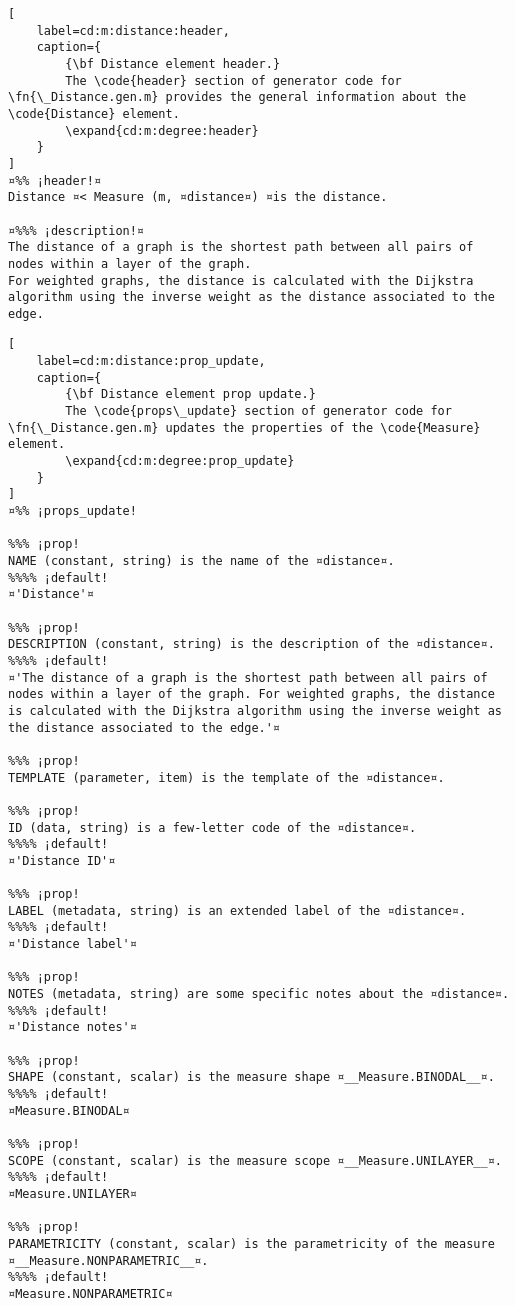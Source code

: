 \documentclass{tufte-handout}
\begin{document}
\begin{lstlisting}[
	label=cd:m:distance:header,
	caption={
		{\bf Distance element header.}
		The \code{header} section of generator code for \fn{\_Distance.gen.m} provides the general information about the \code{Distance} element.
		\expand{cd:m:degree:header}
	}
]
¤%% ¡header!¤
Distance ¤< Measure (m, ¤distance¤) ¤is the distance.

¤%%% ¡description!¤
The distance of a graph is the shortest path between all pairs of nodes within a layer of the graph.
For weighted graphs, the distance is calculated with the Dijkstra algorithm using the inverse weight as the distance associated to the edge.
\end{lstlisting}

\begin{lstlisting}[
	label=cd:m:distance:prop_update,
	caption={
		{\bf Distance element prop update.}
		The \code{props\_update} section of generator code for \fn{\_Distance.gen.m} updates the properties of the \code{Measure} element.
		\expand{cd:m:degree:prop_update}
	}
]
¤%% ¡props_update!

%%% ¡prop!
NAME (constant, string) is the name of the ¤distance¤.
%%%% ¡default!
¤'Distance'¤

%%% ¡prop!
DESCRIPTION (constant, string) is the description of the ¤distance¤.
%%%% ¡default!
¤'The distance of a graph is the shortest path between all pairs of nodes within a layer of the graph. For weighted graphs, the distance is calculated with the Dijkstra algorithm using the inverse weight as the distance associated to the edge.'¤

%%% ¡prop!
TEMPLATE (parameter, item) is the template of the ¤distance¤.

%%% ¡prop!
ID (data, string) is a few-letter code of the ¤distance¤.
%%%% ¡default!
¤'Distance ID'¤

%%% ¡prop!
LABEL (metadata, string) is an extended label of the ¤distance¤.
%%%% ¡default!
¤'Distance label'¤

%%% ¡prop!
NOTES (metadata, string) are some specific notes about the ¤distance¤.
%%%% ¡default!
¤'Distance notes'¤

%%% ¡prop!
SHAPE (constant, scalar) is the measure shape ¤__Measure.BINODAL__¤.
%%%% ¡default!
¤Measure.BINODAL¤

%%% ¡prop!
SCOPE (constant, scalar) is the measure scope ¤__Measure.UNILAYER__¤.
%%%% ¡default!
¤Measure.UNILAYER¤

%%% ¡prop!
PARAMETRICITY (constant, scalar) is the parametricity of the measure ¤__Measure.NONPARAMETRIC__¤.
%%%% ¡default!
¤Measure.NONPARAMETRIC¤


\end{lstlisting}
\end{document}
